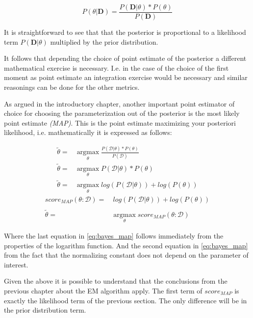 \documentclass[11pt]{article}
\begin{document}
\begin{article}
\begin{equation} \label{eq:bayes_formula}
P (\theta | \textbf{D}) = \frac{P (\textbf{D} | \theta) * P(\theta)}{P (\textbf{D})} 
\end{equation}

It is straightforward to see that that the posterior is proportional
to a likelihood term \(P (\textbf{D} | \theta)\) multiplied by the
prior distribution.

It follows that depending the choice of point estimate of the
posterior a different mathematical exercise is necessary. I.e. in
the case of the choice of the first moment as point estimate an
integration exercise would be necessary and similar reasonings can
be done for the other metrics.

As argued in the introductory chapter, another important point
estimator of choice for choosing the parameterization out of the
posterior is the most likely point estimate \emph{(MAP)}. This is the
point estimate maximizing your posteriori likelihood,
i.e. mathematically it is expressed as follows:

\begin{align} \label{eq:bayes_map}
\tilde{\theta} =& \operatorname*{argmax}_{\theta} \frac{P (\mathcal{D} | \theta) * P(\theta)}{P (\mathcal{D})} \nonumber\\
\tilde{\theta} =& \operatorname*{argmax}_{\theta} P (\mathcal{D} | \theta) * P(\theta)\\ 
\tilde{\theta} =& \operatorname*{argmax}_{\theta} log (P (\mathcal{D} | \theta)) + log (P(\theta)) \nonumber
\end{align}
\begin{align} \label{eq:bayes_map2}
score_{MAP} (\theta : \mathcal{D}) =& \ log (P (\mathcal{D} | \theta)) + log (P(\theta)) \nonumber\\
\nonumber\\
\tilde{\theta} =& \operatorname*{argmax}_{\theta} score_{MAP}(\theta : \mathcal{D}) 
\end{align}

Where the last equation in \ref{eq:bayes_map} follows immediately
from the properties of the logarithm function. And the second
equation in \ref{eq:bayes_map} from the fact that the normalizing
constant does not depend on the parameter of interest.

Given the above it is possible to understand that the conclusions
from the previous chapter about the EM algorithm apply. The first
term of \(score_{MAP}\) is exactly the likelihood term of the previous
section. The only difference will be in the prior distribution term.


\end{article}
\end{document}
